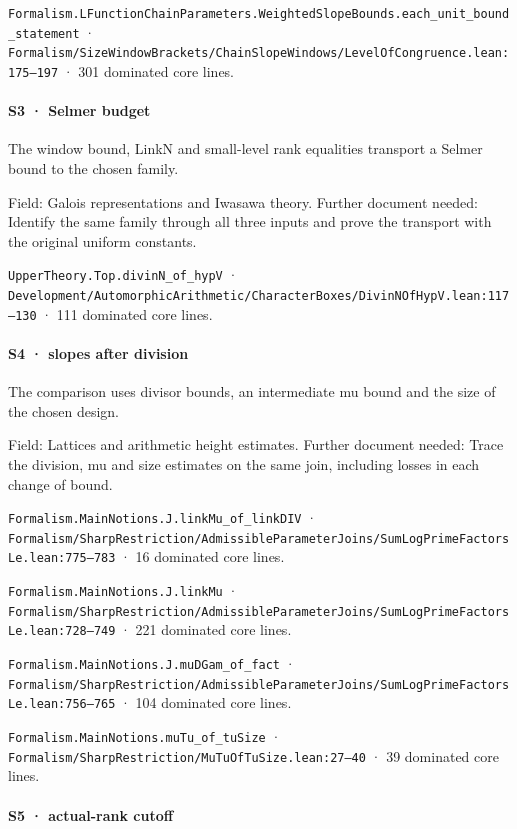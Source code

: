 \nolinkurl{Formalism.LFunctionChainParameters.WeightedSlopeBounds.each_unit_bound_statement} · \nolinkurl{Formalism/SizeWindowBrackets/ChainSlopeWindows/LevelOfCongruence.lean:175–197} · 301 dominated core lines.

\paragraph{S3 · Selmer budget}

The window bound, LinkN and small-level rank equalities transport a Selmer bound to the chosen family.

Field: Galois representations and Iwasawa theory. Further document needed: Identify the same family through all three inputs and prove the transport with the original uniform constants.

\nolinkurl{UpperTheory.Top.divinN_of_hypV} · \nolinkurl{Development/AutomorphicArithmetic/CharacterBoxes/DivinNOfHypV.lean:117–130} · 111 dominated core lines.

\paragraph{S4 · slopes after division}

The comparison uses divisor bounds, an intermediate mu bound and the size of the chosen design.

Field: Lattices and arithmetic height estimates. Further document needed: Trace the division, mu and size estimates on the same join, including losses in each change of bound.

\nolinkurl{Formalism.MainNotions.J.linkMu_of_linkDIV} · \nolinkurl{Formalism/SharpRestriction/AdmissibleParameterJoins/SumLogPrimeFactorsLe.lean:775–783} · 16 dominated core lines.

\nolinkurl{Formalism.MainNotions.J.linkMu} · \nolinkurl{Formalism/SharpRestriction/AdmissibleParameterJoins/SumLogPrimeFactorsLe.lean:728–749} · 221 dominated core lines.

\nolinkurl{Formalism.MainNotions.J.muDGam_of_fact} · \nolinkurl{Formalism/SharpRestriction/AdmissibleParameterJoins/SumLogPrimeFactorsLe.lean:756–765} · 104 dominated core lines.

\nolinkurl{Formalism.MainNotions.muTu_of_tuSize} · \nolinkurl{Formalism/SharpRestriction/MuTuOfTuSize.lean:27–40} · 39 dominated core lines.

\paragraph{S5 · actual-rank cutoff}

